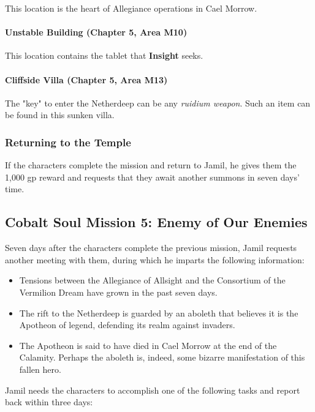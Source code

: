 \documentclass[letterpaper, 11pt, bg=full, twocolumn]{dndbook}
\begin{document}
This location is the heart of Allegiance operations in Cael Morrow.

\paragraph{Unstable Building (Chapter 5, Area M10)}

This location contains the tablet that \textbf{Insight} seeks.

\paragraph{Cliffside Villa (Chapter 5, Area M13)}

The "key" to enter the Netherdeep can be any \textit{ruidium weapon}. Such an item can be found in this sunken villa.

\subsubsection{Returning to the Temple}

If the characters complete the mission and return to Jamil, he gives them the 1,000 gp reward and requests that they await another summons in seven days' time.

\subsection{Cobalt Soul Mission 5: Enemy of Our Enemies}

Seven days after the characters complete the previous mission, Jamil requests another meeting with them, during which he imparts the following information:

\begin{itemize}
\item Tensions between the Allegiance of Allsight and the Consortium of the Vermilion Dream have grown in the past seven days.
\item The rift to the Netherdeep is guarded by an aboleth that believes it is the Apotheon of legend, defending its realm against invaders.
\item The Apotheon is said to have died in Cael Morrow at the end of the Calamity. Perhaps the aboleth is, indeed, some bizarre manifestation of this fallen hero.
\end{itemize}

Jamil needs the characters to accomplish one of the following tasks and report back within three days:
\end{document}
